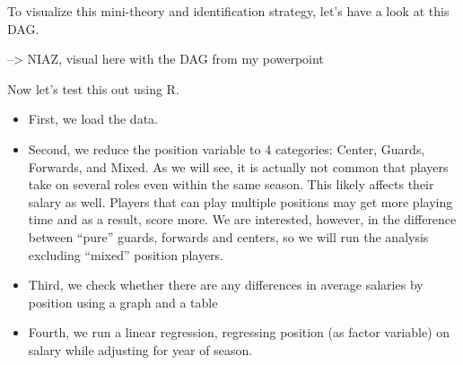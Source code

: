 \documentclass[
]{book}
\providecommand{\tightlist}{%
  \setlength{\itemsep}{0pt}\setlength{\parskip}{0pt}}
\begin{document}
To visualize this mini-theory and identification strategy, let's have a look at this DAG.

--\textgreater{} NIAZ, visual here with the DAG from my powerpoint

Now let's test this out using R.

\begin{itemize}
\tightlist
\item
  First, we load the data.
\item
  Second, we reduce the position variable to 4 categories: Center, Guards, Forwards, and Mixed. As we will see, it is actually not common that players take on several roles even within the same season. This likely affects their salary as well. Players that can play multiple positions may get more playing time and as a result, score more. We are interested, however, in the difference between ``pure'' guards, forwards and centers, so we will run the analysis excluding ``mixed'' position players.
\item
  Third, we check whether there are any differences in average salaries by position using a graph and a table
\item
  Fourth, we run a linear regression, regressing position (as factor variable) on salary while adjusting for year of season.
\end{itemize}
\end{document}
